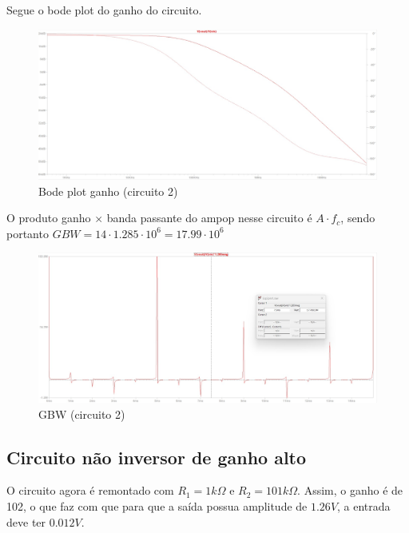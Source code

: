\documentclass[10pt,twocolumn,letterpaper]{article}
\begin{document}
\newpage
Segue o bode plot do ganho do circuito.

\begin{figure}[h]
\caption{Bode plot ganho (circuito 2)}
\begin{center}
\includegraphics[scale=0.15]{figuras/fig9}
\end{center}
\end{figure}

O produto ganho $\times$ banda passante do ampop nesse circuito é $A\cdot f_c$, sendo portanto $GBW = 14\cdot1.285\cdot10^6=17.99\cdot10^6$

\begin{figure}[h]
\caption{GBW (circuito 2)}
\begin{center}
\includegraphics[scale=0.15]{figuras/fig10}
\end{center}
\end{figure}

\subsection{Circuito não inversor de ganho alto}

O circuito agora é remontado com $R_1=1k\Omega$ e $R_2=101k\Omega$. Assim, o ganho é de 102, o que faz com que para que a saída possua amplitude de $1.26V$, a entrada deve ter $0.012V$.
\end{document}
